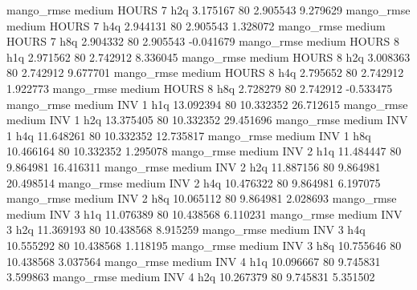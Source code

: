        mango_rmse     medium    HOURS                 7                  h2q  3.175167 80       2.905543           9.279629
       mango_rmse     medium    HOURS                 7                  h4q  2.944131 80       2.905543           1.328072
       mango_rmse     medium    HOURS                 7                  h8q  2.904332 80       2.905543          -0.041679
       mango_rmse     medium    HOURS                 8                  h1q  2.971562 80       2.742912           8.336045
       mango_rmse     medium    HOURS                 8                  h2q  3.008363 80       2.742912           9.677701
       mango_rmse     medium    HOURS                 8                  h4q  2.795652 80       2.742912           1.922773
       mango_rmse     medium    HOURS                 8                  h8q  2.728279 80       2.742912          -0.533475
       mango_rmse     medium      INV                 1                  h1q 13.092394 80      10.332352          26.712615
       mango_rmse     medium      INV                 1                  h2q 13.375405 80      10.332352          29.451696
       mango_rmse     medium      INV                 1                  h4q 11.648261 80      10.332352          12.735817
       mango_rmse     medium      INV                 1                  h8q 10.466164 80      10.332352           1.295078
       mango_rmse     medium      INV                 2                  h1q 11.484447 80       9.864981          16.416311
       mango_rmse     medium      INV                 2                  h2q 11.887156 80       9.864981          20.498514
       mango_rmse     medium      INV                 2                  h4q 10.476322 80       9.864981           6.197075
       mango_rmse     medium      INV                 2                  h8q 10.065112 80       9.864981           2.028693
       mango_rmse     medium      INV                 3                  h1q 11.076389 80      10.438568           6.110231
       mango_rmse     medium      INV                 3                  h2q 11.369193 80      10.438568           8.915259
       mango_rmse     medium      INV                 3                  h4q 10.555292 80      10.438568           1.118195
       mango_rmse     medium      INV                 3                  h8q 10.755646 80      10.438568           3.037564
       mango_rmse     medium      INV                 4                  h1q 10.096667 80       9.745831           3.599863
       mango_rmse     medium      INV                 4                  h2q 10.267379 80       9.745831           5.351502
